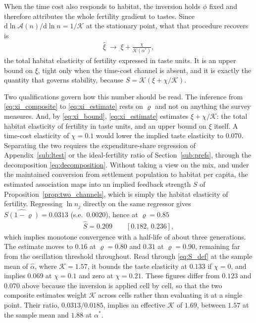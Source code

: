 \documentclass[11pt]{article}
\begin{document}
When the time cost also responds to habitat, the inversion holds $\phi$ fixed and therefore attributes the whole fertility
gradient to tastes. Since $\mathrm{d}\ln\mathcal{A}(n)/\mathrm{d}\ln n=1/\mathcal{K}$ at the
stationary point, what that procedure recovers is
\begin{align}
\hat\xi\;\longrightarrow\;\xi+\frac{\chi}{\mathcal{K}(\alpha^{\ast})},
\label{eq:xi_bound}
\end{align}
the total habitat elasticity of fertility expressed in taste units. It is an upper bound on $\xi$,
tight only when the time-cost channel is absent, and it is exactly the quantity that governs
stability, because $S=\mathcal{K}\left(\xi+\chi/\mathcal{K}\right)$.

Two qualifications govern how this number should be read. The inference from
\eqref{eq:xi_composite} to \eqref{eq:xi_estimate} rests on $\varrho$ and not on anything the survey
measures. And, by \eqref{eq:xi_bound}, \eqref{eq:xi_estimate} estimates $\xi+\chi/\mathcal{K}$: the total habitat
elasticity of fertility in taste units, and an upper bound on $\xi$ itself. A time-cost elasticity
of $\chi=0.1$ would lower the implied taste elasticity to $0.070$. Separating the two requires the
expenditure-share regression of Appendix~\ref{sub:ltest} or the ideal-fertility ratio of
Section~\ref{sub:prefs}, through the decomposition \eqref{eq:decomposition}. Without taking a view on the mix, and under the maintained conversion from settlement population
to habitat per capita, the estimated association maps into an implied feedback strength $S$ of
Proposition~\ref{prop:two_channels}, which is simply the habitat elasticity of fertility.
Regressing $\ln n_j$ directly on the same regressor gives $\widehat{S(1-\varrho)}=0.0313$
(s.e.\ $0.0020$), hence at $\varrho=0.85$
\begin{align}
\hat S=0.209\qquad[0.182,\,0.236],
\label{eq:S_estimate}
\end{align}
which implies monotone convergence with a half-life of about three generations. The estimate moves
to $0.16$ at $\varrho=0.80$ and $0.31$ at $\varrho=0.90$, remaining far from the oscillation threshold
throughout. Read through \eqref{eq:S_def} at the sample mean of $\hat\alpha$, where
$\mathcal{K}=1.57$, it bounds the taste elasticity at $0.133$ if $\chi=0$, and implies $0.069$ at
$\chi=0.1$ and zero at $\chi=0.21$. These figures differ from $0.123$ and $0.070$ above because the
inversion is applied cell by cell, so that the two composite estimates weight $\mathcal{K}$ across
cells rather than evaluating it at a single point. Their ratio, $0.0313/0.0185$, implies an effective
$\mathcal{K}$ of $1.69$, between $1.57$ at the sample mean and $1.88$ at $\alpha^\ast$.
\end{document}
